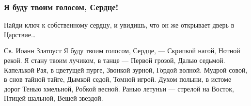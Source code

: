  
 
 

\subsubsection{Я буду твоим голосом, Сердце!}

Найди ключ к собственному сердцу,
и увидишь, что он же открывает дверь в Царствие…

Св. Иоанн Златоуст
Я буду твоим голосом, Сердце, —
Скрипкой нагой,
Нотной рекой.
Я стану твоим лучиком, в танце —
Первой грозой,
Далью седьмой.
Капелькой Рая, в цветущей пурге,
Звонкой зурной,
Гордой волной.
Мудрой совой, в снов тайной тайге,
Дымкой седой,
Томной игрой.
Духом полыни, в истоме дорог
Тенью хмельной,
Робкой весной.
Ранью летуньи — стрелой на Восток,
Птицей шальной,
Вешей звездой.
